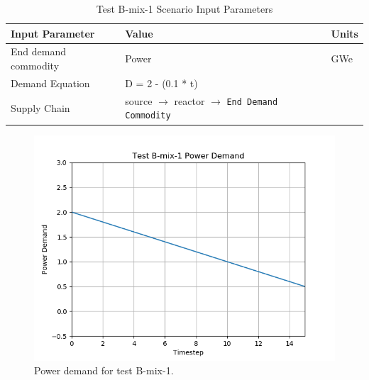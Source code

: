 \documentclass[11pt,letterpaper]{article}
\begin{document}
\begin{table}[H]
	\centering
	\caption{Test B-mix-1 Scenario Input Parameters }
	\label{tab:test_B-mix-1}
	\begin{tabular}{|l|l|l|}
		\hline
		\textbf{Input Parameter} & \textbf{Value} & \textbf{Units} \\
		\hline
		End demand commodity & Power & GWe \\
		Demand Equation & D = 2 - (0.1 * t) & \\
		Supply Chain & source $\rightarrow$ reactor $\rightarrow$ \texttt{End Demand Commodity} &  \\
		\hline
	\end{tabular}
\end{table}

\begin{figure}[H]
	\begin{center}
		\includegraphics[scale=0.7]{./images/B-mix-1.png}
	\end{center}
	\caption{Power demand for test B-mix-1.}
	\label{fig:B-dep-2}
\end{figure}
\end{document}
